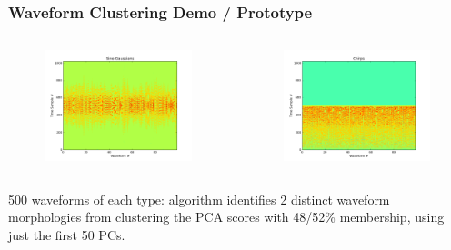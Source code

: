 \documentclass{beamer}
\begin{document}
\begin{frame}
    \frametitle{Waveform Clustering Demo / Prototype}

    \begin{columns}[]
        \begin{center}
        \begin{figure}
            \vspace*{-0.5cm}
            \includegraphics[scale=0.3]{sinegaussians.png} 
        \end{figure}
        \end{center}

        \begin{center}
        \begin{figure}
            \vspace*{-0.5cm}
            \includegraphics[scale=0.3]{chirps.png} 
        \end{figure}
        \end{center}
    \end{columns}

500 waveforms of each type: algorithm identifies 2 distinct waveform
morphologies from clustering the PCA scores with 48/52\% membership, using just
the first 50 PCs.

\end{frame}
\end{document}
